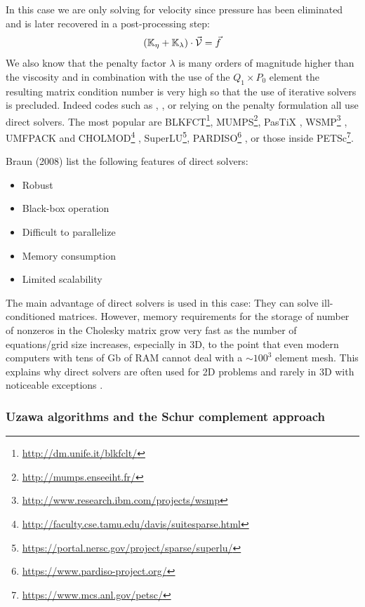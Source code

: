 In this case we are only solving for 
velocity since pressure has been eliminated and is later recovered in a post-processing step:
\[
({\mathbb{K}}_\eta+{\mathbb{K}}_\lambda) \cdot \vec {\cal V} = \vec f
\]
 We also know that 
the penalty factor $\lambda$ is many orders of magnitude higher than the viscosity and 
in combination with the use of the $Q_1 \times P_0$ element the resulting matrix 
condition number is very high so that the use of iterative solvers is precluded. 
Indeed codes such as \sopale \cite{full95}, \douar \cite{brtf08}, \fantom \cite{thie11} 
or \sulec \cite{qube11} relying on the penalty formulation all use direct solvers.
The most popular are BLKFCT\footnote{\url{http://dm.unife.it/blkfclt/}}, 
MUMPS\footnote{\url{http://mumps.enseeiht.fr/}}\cite{amdu89,amdl00,amdk01,amgl06,ambl19}, 
PasTiX \cite{herr02},
WSMP\footnote{\url{http://www.research.ibm.com/projects/wsmp}} \cite{GUPTA94ieee,GUPTA09sc-long},
UMFPACK and CHOLMOD\footnote{\url{http://faculty.cse.tamu.edu/davis/suitesparse.html}}
, SuperLU\footnote{\url{https://portal.nersc.gov/project/sparse/superlu/}}, 
PARDISO\footnote{\url{https://www.pardiso-project.org/}}
\cite{pardiso-6.0a,pardiso-6.0b,pardiso-6.0c}, or those inside 
PETSc\footnote{\url{https://www.mcs.anl.gov/petsc/}}.

Braun \etal (2008) \cite{brtf08} list the following features of direct solvers:
\begin{itemize}
\item Robust
\item Black-box operation
\item Difficult to parallelize
\item Memory consumption
\item Limited scalability
\end{itemize}

The main advantage of direct solvers is used in this case: They can solve ill-conditioned 
matrices. However, memory requirements for the storage of number of nonzeros in the 
Cholesky matrix grow very fast as the number of equations/grid size increases, especially in 3D,
to the point that even modern computers with tens of Gb of RAM cannot deal with a $\sim 100^3$ element mesh.
This explains why direct solvers are often used for 2D problems and rarely in 3D with noticeable 
exceptions \cite{thfb08,yahb09,brya10,lobh10,alht11,alht12,alhf13,whbb14,neew18}. 

\subsubsection{Uzawa algorithms and the Schur complement approach }

